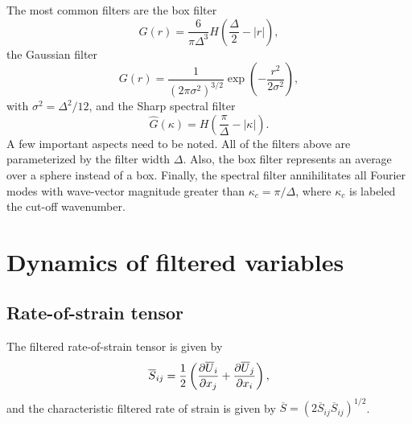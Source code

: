 \documentclass[oneside,a4paper,11pt]{report}
\begin{document}
The most common filters are the box filter 
\begin{equation}
G( r ) = \frac{6 }{\pi  \Delta^3} H ( \frac{\Delta}{2} - | r | ),
\end{equation}
the Gaussian filter
\begin{equation}
G( r ) = \frac{ 1 }{ ( 2 \pi \sigma^2 )^{3/2} } \exp \left( -\frac{ r^2 }{ 2 \sigma^2  } \right ),
\end{equation}
with $\sigma^2 = \Delta^2/12$, and the Sharp spectral filter
\begin{equation}
\hat{G}( \kappa ) = H( \frac{ \pi }{ \Delta } - | \kappa | ).
\end{equation}
A few important aspects need to be noted. All of the filters above are parameterized by the filter width $\Delta$. Also, the box filter represents an average over a sphere instead of a box. Finally, the spectral filter annihilitates all Fourier modes with wave-vector magnitude greater than $\kappa_c = \pi / \Delta$, where $\kappa_c$ is labeled the cut-off wavenumber.


\section{Dynamics of filtered variables}


\subsection{Rate-of-strain tensor}
The filtered rate-of-strain tensor is given by
\begin{equation}
\overline{S}_{ij} = \frac{1}{2} \left ( \frac{\partial \overline{U}_i}{\partial x_j} + \frac{\partial \overline{U}_j}{\partial x_i} \right ),
\end{equation}
and the characteristic filtered rate of strain is given by $\overline{S} = \left ( 2 \overline{S}_{ij} \overline{S}_{ij} \right ) ^{1/2}$. 
\end{document}
